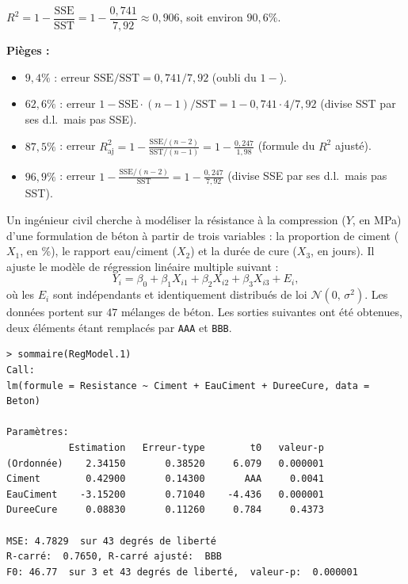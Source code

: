 \begin{questions}
\begin{parts}
\begin{solution}
$R^2=1-\dfrac{\text{SSE}}{\text{SST}}=1-\dfrac{0{,}741}{7{,}92}\approx 0{,}906$, soit environ $90{,}6\%$.

\medskip
\textbf{Pièges :}
\begin{itemize}
\item $9{,}4\%$ : erreur $\text{SSE}/\text{SST}=0{,}741/7{,}92$ (oubli du $1-$).
\item $62{,}6\%$ : erreur $1-\text{SSE}\cdot(n-1)/\text{SST}=1-0{,}741\cdot 4/7{,}92$ (divise SST par ses d.l.\ mais pas SSE).
\item $87{,}5\%$ : erreur $R^2_{\text{aj}}=1-\frac{\text{SSE}/(n-2)}{\text{SST}/(n-1)}=1-\frac{0{,}247}{1{,}98}$ (formule du $R^2$ ajusté).
\item $96{,}9\%$ : erreur $1-\frac{\text{SSE}/(n-2)}{\text{SST}}=1-\frac{0{,}247}{7{,}92}$ (divise SSE par ses d.l.\ mais pas SST).
\end{itemize}
\end{solution}

\end{parts}

\pageblanche

\question\label{rlm}
Un ingénieur civil cherche à modéliser la résistance à la compression ($Y$, en MPa) d'une formulation de béton à partir de trois variables : la proportion de ciment ($X_1$, en \%), le rapport eau/ciment ($X_2$) et la durée de cure ($X_3$, en jours).
Il ajuste le modèle de régression linéaire multiple suivant :
$$Y_i=\beta_0+\beta_1X_{i1}+\beta_2X_{i2}+\beta_3X_{i3}+E_i,$$
où les $E_i$ sont indépendants et identiquement distribués de loi $\mathcal{N}(0,\,\sigma^2)$.
Les données portent sur $47$ mélanges de béton. Les sorties suivantes ont été obtenues, deux éléments étant remplacés par \texttt{AAA} et \texttt{BBB}.

\begin{verbatim}
> sommaire(RegModel.1)
Call:
lm(formule = Resistance ~ Ciment + EauCiment + DureeCure, data = Beton)

Paramètres:
           Estimation   Erreur-type        t0   valeur-p
(Ordonnée)    2.34150       0.38520     6.079   0.000001
Ciment        0.42900       0.14300       AAA     0.0041
EauCiment    -3.15200       0.71040    -4.436   0.000001
DureeCure     0.08830       0.11260     0.784     0.4373

MSE: 4.7829  sur 43 degrés de liberté
R-carré:  0.7650, R-carré ajusté:  BBB
F0: 46.77  sur 3 et 43 degrés de liberté,  valeur-p:  0.000001
\end{verbatim}


\end{questions}
